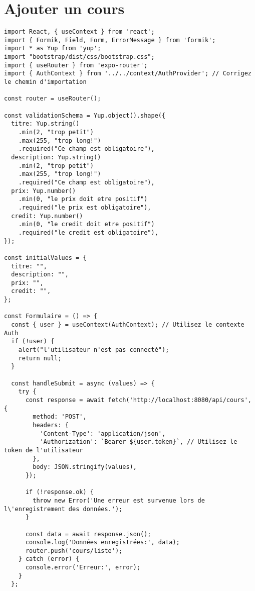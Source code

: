 \documentclass[10pt,a4paper]{article}
\begin{document}
\section{Ajouter un cours}
\begin{verbatim}
import React, { useContext } from 'react';
import { Formik, Field, Form, ErrorMessage } from 'formik';
import * as Yup from 'yup';
import "bootstrap/dist/css/bootstrap.css";
import { useRouter } from 'expo-router';
import { AuthContext } from '../../context/AuthProvider'; // Corrigez le chemin d'importation

const router = useRouter();

const validationSchema = Yup.object().shape({
  titre: Yup.string()
    .min(2, "trop petit")
    .max(255, "trop long!")
    .required("Ce champ est obligatoire"),
  description: Yup.string()
    .min(2, "trop petit")
    .max(255, "trop long!")
    .required("Ce champ est obligatoire"),
  prix: Yup.number()
    .min(0, "le prix doit etre positif")
    .required("le prix est obligatoire"),
  credit: Yup.number()
    .min(0, "le credit doit etre positif")
    .required("le credit est obligatoire"),
});

const initialValues = {
  titre: "",
  description: "",
  prix: "",
  credit: "",
};

const Formulaire = () => {
  const { user } = useContext(AuthContext); // Utilisez le contexte Auth
  if (!user) {
    alert("l'utilisateur n'est pas connecté");
    return null;
  }

  const handleSubmit = async (values) => {
    try {
      const response = await fetch('http://localhost:8080/api/cours', {
        method: 'POST',
        headers: {
          'Content-Type': 'application/json',
          'Authorization': `Bearer ${user.token}`, // Utilisez le token de l'utilisateur
        },
        body: JSON.stringify(values),
      });

      if (!response.ok) {
        throw new Error('Une erreur est survenue lors de l\'enregistrement des données.');
      }

      const data = await response.json();
      console.log('Données enregistrées:', data);
      router.push('cours/liste');
    } catch (error) {
      console.error('Erreur:', error);
    }
  };


\end{verbatim}
\end{document}
